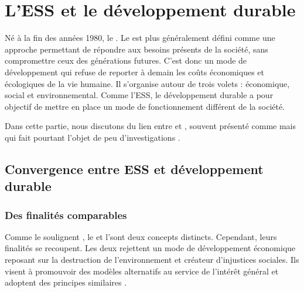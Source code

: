 \section{L'ESS et le développement durable}

    Né à la fin des années 1980, le \dd {} \parencite[][p.118]{reynaud2004developpement}. Le \dd est plus généralement défini comme une approche permettant de répondre aux besoins présents de la société, sans compromettre ceux des générations futures. C’est donc un mode de développement qui refuse de reporter à demain les coûts économiques et écologiques de la vie humaine. Il s’organise autour de trois volets : économique, social et environnemental. Comme l’ESS, le développement durable a pour objectif de mettre en place un mode de fonctionnement différent de la société.

    Dans cette partie, nous discutons du lien entre \ess et \dd, souvent présenté comme  \parencite{cretieneau2010economie} mais qui fait pourtant l’objet de peu d’investigations \parencite{dart2010green,edwards2013environmental} .

    \subsection{Convergence entre ESS et développement durable}

        \subsubsection{Des finalités comparables}

            Comme le soulignent \textcite{gendron2011developpement}, le \dd et l’\ess sont deux concepts distincts. Cependant, leurs finalités se recoupent. Les deux rejettent un mode de développement économique reposant sur la destruction de l’environnement et créateur d’injustices sociales. Ils visent à promouvoir des modèles alternatifs au service de l’intérêt général et adoptent des principes similaires \parencite{cretieneau2010economie,gendron2011developpement}. \\

